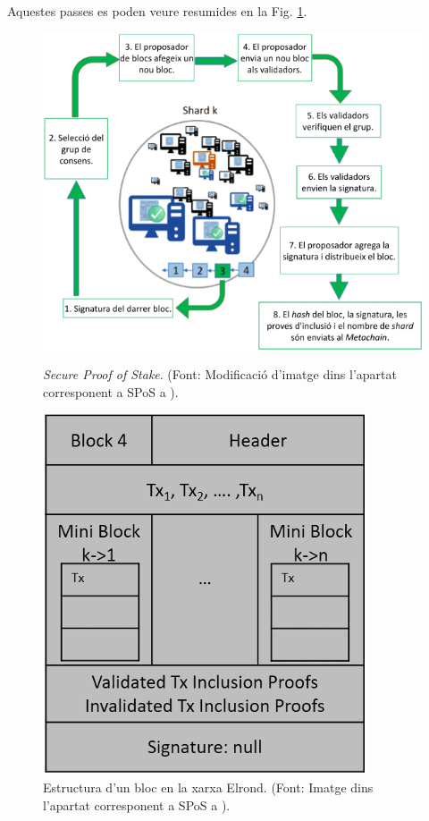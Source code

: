 \documentclass[11pt,a4paper]{article}
\begin{document}
Aquestes passes es poden veure resumides en la Fig. \ref{fig:SPoS}.

\begin{figure}[h]
  \centering
  \begin{minipage}[b]{0.65\textwidth}
    \includegraphics[width=\textwidth]{SPoS01.png}
    \caption{\textit{Secure Proof of Stake}. (Font: Modificació d'imatge dins l'apartat corresponent a SPoS a \cite{elrond2022}).}
    \label{fig:SPoS}
  \end{minipage}
  \hfill
  \begin{minipage}[b]{0.33\textwidth}
    \includegraphics[width=\textwidth]{SPoS02.png}
    \caption{Estructura d'un bloc en la xarxa Elrond. (Font: Imatge dins l'apartat corresponent a SPoS a \cite{elrond2022}).}
  \end{minipage}
\end{figure}
\end{document}
